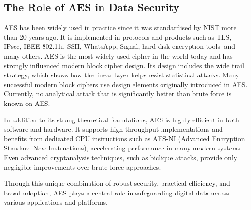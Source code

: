 \subsection{The Role of AES in Data Security}

\noindent AES has been widely used in practice since it was standardised by NIST more than 20 years ago. 
It is implemented in protocols and products such as TLS, IPsec, IEEE 802.11i, SSH, 
WhatsApp, Signal, hard disk encryption tools, and many others. 
AES is the most widely used cipher in the world today and has strongly influenced modern block cipher design. 
Its design includes the wide trail strategy, which shows how the linear layer helps resist statistical attacks. 
Many successful modern block ciphers use design elements originally introduced in AES. 
Currently, no analytical attack that is significantly better than brute force is known on AES.\newline

\noindent In addition to its strong theoretical foundations, 
AES is highly efficient in both software and hardware. 
It supports high-throughput implementations and benefits from dedicated CPU instructions such as AES-NI (Advanced Encryption Standard New Instructions), 
accelerating performance in many modern systems. 
Even advanced cryptanalysis techniques, such as biclique attacks, 
provide only negligible improvements over brute-force approaches.\newline

\noindent Through this unique combination of robust security, practical efficiency, and broad adoption, 
AES plays a central role in safeguarding digital data across various applications and platforms.